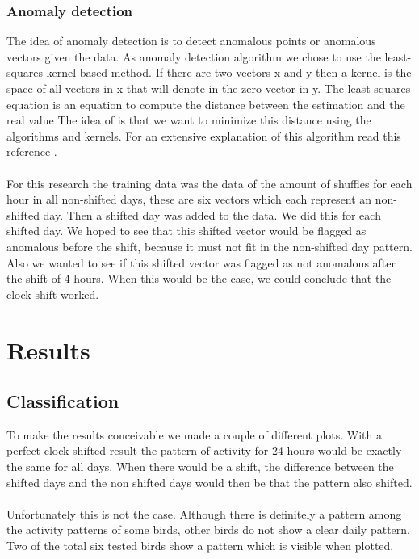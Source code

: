 \documentclass[a4paper]{article}
\begin{document}
\subsubsection*{Anomaly detection}
The idea of anomaly detection is to detect anomalous points or anomalous vectors given the data. As anomaly detection algorithm we chose to use the least-squares kernel based method. If there are two vectors x and y then a kernel is the space of all vectors in x that will denote in the zero-vector in y. The least squares equation is an equation to compute the distance between the estimation and the real value The idea of is that we want to minimize this distance using the algorithms and kernels. For an extensive explanation of this algorithm read this reference \cite{engel2004kernel}.\\\\
For this research the training data was the data of the amount of shuffles for each hour in all non-shifted days, these are six vectors which each represent an non-shifted day. Then a shifted day was added to the data. We did this for each shifted day. We hoped to see that this shifted vector would be flagged as anomalous before the shift, because it must not fit in the non-shifted day pattern. Also we wanted to see if this shifted vector was flagged as not anomalous after the shift of 4 hours. When this would be the case, we could conclude that the clock-shift worked.
\section*{Results}

\subsection*{Classification}
To make the results conceivable we made a couple of different plots. With a perfect clock shifted result the pattern of activity for 24 hours would be exactly the same for all days. When there would be a shift, the difference between the shifted days and the non shifted days would then be that the pattern also shifted. \\ \\
Unfortunately this is not the case. Although there is definitely a pattern among the activity patterns of some birds, other birds do not show a clear daily pattern. Two of the total six tested birds show a pattern which is visible when plotted.
\end{document}
